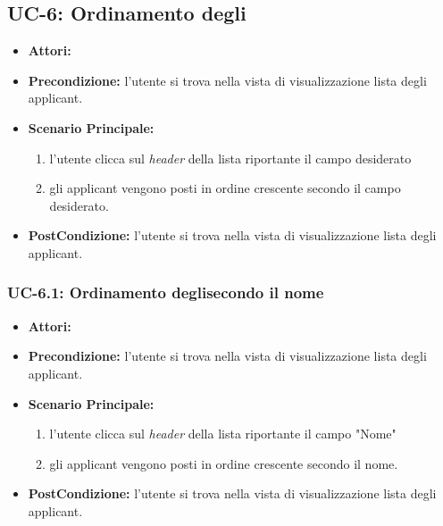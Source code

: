 \subsection{UC-6: Ordinamento degli\applicant}
\begin{itemize}
	\item \textbf{Attori:}\loggedusr
	\item \textbf{Precondizione:} l'utente si trova nella vista di visualizzazione lista degli applicant.
	\item \textbf{Scenario Principale:}
	\begin{enumerate}
		\item l'utente clicca sul \textit{header} della lista riportante il campo desiderato
		\item gli applicant vengono posti in ordine crescente secondo il campo desiderato.
	\end{enumerate}
	\item \textbf{PostCondizione:}  l'utente si trova nella vista di visualizzazione lista degli applicant.
\end{itemize}


\subsubsection{UC-6.1: Ordinamento degli\applicant secondo il nome}
\begin{itemize}
	\item \textbf{Attori:}\loggedusr
	\item \textbf{Precondizione:} l'utente si trova nella vista di visualizzazione lista degli applicant.
	\item \textbf{Scenario Principale:}
	\begin{enumerate}
		\item l'utente clicca sul \textit{header} della lista riportante il campo "Nome"
		\item gli applicant vengono posti in ordine crescente secondo il nome.
	\end{enumerate}
	\item \textbf{PostCondizione:}  l'utente si trova nella vista di visualizzazione lista degli applicant.
\end{itemize}

